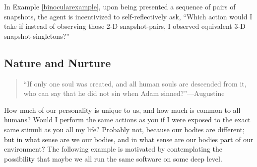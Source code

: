 \documentclass[runningheads]{llncs}
\begin{document}
In Example \ref{binocularexample}, upon being presented a sequence of pairs of snapshots,
the agent is incentivized to self-reflectively ask, ``Which action would I take if instead
of observing those 2-D snapshot-pairs, I observed equivalent 3-D snapshot-singletons?''

\subsection{Nature and Nurture}

\begin{quote}
    ``If only one soul was created, and all human souls are descended from it,
    who can say that he did not sin when Adam sinned?''---Augustine \cite{augustine1993free}
\end{quote}

How much of our personality is unique to us, and how much is common to all humans?
Would I perform the same actions as you if I were exposed to the exact same stimuli as
you all my life? Probably not, because our bodies are different; but in what sense are
we our bodies, and in what sense are our bodies part of our environment?
The following example is motivated by contemplating the possibility that maybe we all
run the same software on some deep level.
\end{document}
